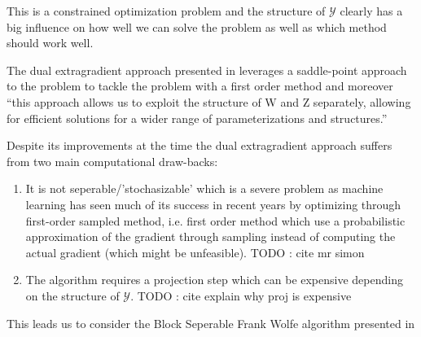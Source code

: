 This is a constrained optimization problem and the structure of $\mathcal Y$
clearly has a big influence on how well we can solve the problem as
well as which method should work well. 

The dual extragradient approach presented in
\citet{taskarStructuredPredictionDual2006} leverages
a saddle-point approach to the problem to tackle the problem
with a first order method and moreover ``this approach
allows us to exploit the structure of W and Z separately, allowing for efficient solutions for a wider
range of parameterizations and structures.''\citep{taskarStructuredPredictionDual2006}

\clearpage
Despite its improvements at the time the dual extragradient approach suffers
from two main computational draw-backs:
\begin{enumerate}
\item It is not seperable/'stochasizable' which is a severe problem as
  machine learning has seen much of its success in recent years by optimizing
  through first-order sampled method, i.e. first order method which
  use a probabilistic approximation of the gradient through sampling instead
  of computing the actual gradient (which might be unfeasible).
  TODO : cite mr simon

\item  The algorithm requires a projection step which can be expensive depending
  on the structure of $\mathcal Y$.
  TODO : cite explain why proj is expensive
\end{enumerate} 
 
This leads us to consider the Block Seperable Frank Wolfe algorithm
presented in \citet{lacoste-julienBlockCoordinateFrankWolfeOptimization2013}




